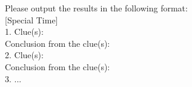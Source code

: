 \begin{figure*}[hbt!]
\begin{center}
\begin{tcolorbox}
            
            Please output the results in the following format:  \\
            
            [Special Time]  \\
            1. Clue(s):   \\
            Conclusion from the clue(s):   \\
            2. Clue(s):   \\
            Conclusion from the clue(s):   \\
            3. ...  \\
            
            
            
            
            

\end{tcolorbox}
\end{center}
\end{figure*}
